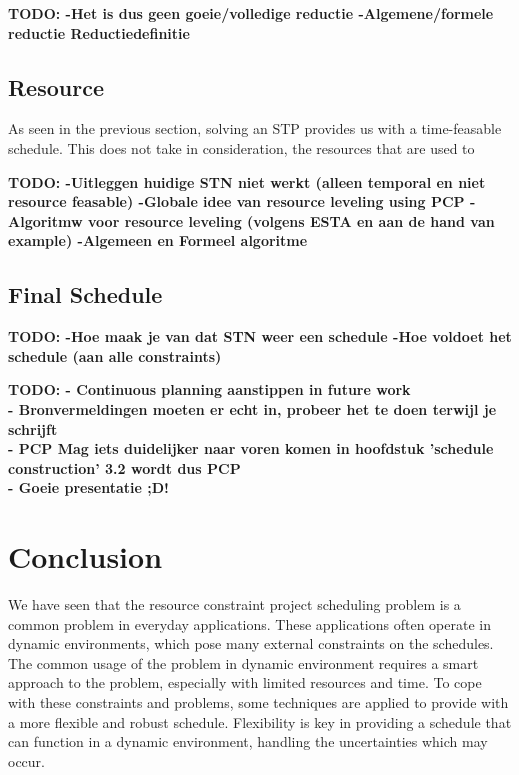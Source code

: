 \documentclass{article}
\theoremstyle{definition}
\newcommand{\TODO}[1]{{\color{red}\textbf{TODO: #1}}}
\begin{document}
\TODO{
		-Het is dus geen goeie/volledige reductie
		-Algemene/formele reductie Reductiedefinitie
	}

\subsection{Resource}
\label{text:PCP}
As seen in the previous section, solving an STP provides us with a time-feasable schedule. This does not take in consideration, the resources that are used to 

\TODO{
		-Uitleggen huidige STN niet werkt (alleen temporal en niet resource feasable)
		-Globale idee van resource leveling using PCP
		-Algoritmw voor resource leveling (volgens ESTA en aan de hand van example)
		-Algemeen en Formeel algoritme
		}

\subsection{Final Schedule}

\TODO{
		-Hoe maak je van dat STN weer een schedule
		-Hoe voldoet het schedule (aan alle constraints)
}

\newpage

\TODO{
 - Continuous planning aanstippen in future work \\
 - Bronvermeldingen moeten er echt in, probeer het te doen terwijl je schrijft \\
 - PCP Mag iets duidelijker naar voren komen in hoofdstuk 'schedule construction' 3.2 wordt dus PCP \\
 - Goeie presentatie ;D!
 }

\newpage
 
\section{Conclusion}

We have seen that the resource constraint project scheduling problem is a common problem in everyday applications.
These applications often operate in dynamic environments, which pose many external constraints on the schedules.
The common usage of the problem in dynamic environment requires a smart approach to the problem, especially with limited resources and time.
To cope with these constraints and problems, some techniques are applied to provide with a more flexible and robust schedule.
Flexibility is key in providing a schedule that can function in a dynamic environment, handling the uncertainties which may occur.
\end{document}
